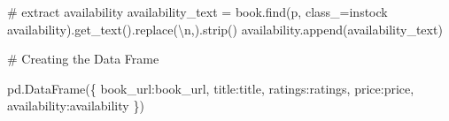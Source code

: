 \documentclass[
  letterpaper,
  DIV=11,
  numbers=noendperiod]{scrreprt}
\newenvironment{Shaded}{\begin{snugshade}}{\end{snugshade}}
\newcommand{\CharTok}[1]{\textcolor[rgb]{0.13,0.47,0.30}{#1}}
\newcommand{\CommentTok}[1]{\textcolor[rgb]{0.37,0.37,0.37}{#1}}
\newcommand{\NormalTok}[1]{\textcolor[rgb]{0.00,0.23,0.31}{#1}}
\newcommand{\OperatorTok}[1]{\textcolor[rgb]{0.37,0.37,0.37}{#1}}
\newcommand{\StringTok}[1]{\textcolor[rgb]{0.13,0.47,0.30}{#1}}
\begin{document}
\begin{Shaded}
\begin{Highlighting}[]
    \CommentTok{\# extract availability }
\NormalTok{    availability\_text }\OperatorTok{=}\NormalTok{ book.find(}\StringTok{\textquotesingle{}p\textquotesingle{}}\NormalTok{, class\_}\OperatorTok{=}\StringTok{\textquotesingle{}instock availability\textquotesingle{}}\NormalTok{).get\_text().replace(}\StringTok{\textquotesingle{}}\CharTok{\textbackslash{}n}\StringTok{\textquotesingle{}}\NormalTok{,}\StringTok{\textquotesingle{}\textquotesingle{}}\NormalTok{).strip()}
\NormalTok{    availability.append(availability\_text)}

\CommentTok{\# Creating the Data Frame }

\NormalTok{pd.DataFrame(\{}
    \StringTok{\textquotesingle{}book\_url\textquotesingle{}}\NormalTok{:book\_url,}
    \StringTok{\textquotesingle{}title\textquotesingle{}}\NormalTok{:title,}
    \StringTok{\textquotesingle{}ratings\textquotesingle{}}\NormalTok{:ratings,}
    \StringTok{\textquotesingle{}price\textquotesingle{}}\NormalTok{:price,}
    \StringTok{\textquotesingle{}availability\textquotesingle{}}\NormalTok{:availability}
\NormalTok{\})}
\end{Highlighting}
\end{Shaded}
\end{document}
